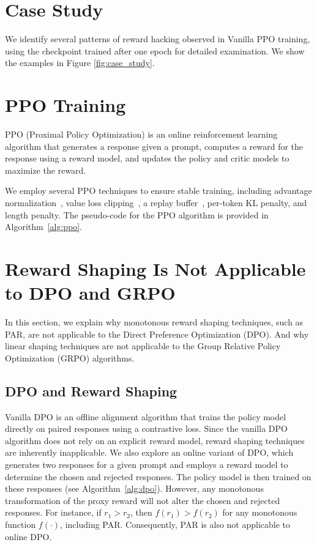 \section{Case Study}
We identify several patterns of reward hacking observed in Vanilla PPO training, using the checkpoint trained after one epoch for detailed examination. We show the examples in Figure \ref{fig:case_study}.



\section{PPO Training}
PPO (Proximal Policy Optimization) is an online reinforcement learning algorithm that generates a response given a prompt, computes a reward for the response using a reward model, and updates the policy and critic models to maximize the reward.

We employ several PPO techniques to ensure stable training, including advantage normalization~\cite{zheng2023secretsrlhflargelanguage}, value loss clipping~\cite{patterson2023robustlosseslearningvalue}, a replay buffer~\cite{eysenbach2019searchreplaybufferbridging}, per-token KL penalty, and length penalty. The pseudo-code for the PPO algorithm is provided in Algorithm~\ref{alg:ppo}.


\section{Reward Shaping Is Not Applicable to DPO and GRPO}
\label{section:rsnotavail}
In this section, we explain why monotonous reward shaping techniques, such as PAR, are not applicable to the Direct Preference Optimization (DPO). And why linear shaping techniques are not applicable to the Group Relative Policy Optimization (GRPO) algorithms.

\subsection{DPO and Reward Shaping}
Vanilla DPO is an offline alignment algorithm that trains the policy model directly on paired responses using a contrastive loss. Since the vanilla DPO algorithm does not rely on an explicit reward model, reward shaping techniques are inherently inapplicable. We also explore an online variant of DPO, which generates two responses for a given prompt and employs a reward model to determine the chosen and rejected responses. The policy model is then trained on these responses (see Algorithm~\ref{alg:dpo}). However, any monotonous transformation of the proxy reward will not alter the chosen and rejected responses. For instance, if \( r_1 > r_2 \), then \( f(r_1) > f(r_2) \) for any monotonous function \( f(\cdot) \), including PAR. Consequently, PAR is also not applicable to online DPO.

